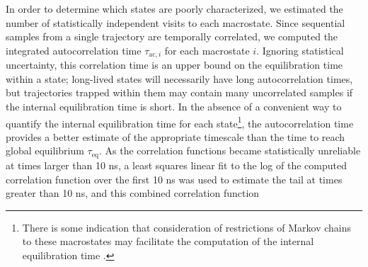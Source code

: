 In order to determine which states are poorly characterized, we estimated the number of statistically independent visits to each macrostate.
Since sequential samples from a single trajectory are temporally correlated, we computed the integrated autocorrelation time \cite{swope:1982a,janke:2002a} $\tau_{\mathrm{ac},i}$ for each macrostate $i$.
Ignoring statistical uncertainty, this correlation time is an upper bound on the equilibration time within a state; long-lived states will necessarily have long autocorrelation times, but trajectories trapped within them may contain many uncorrelated samples if the internal equilibration time is short.
In the absence of a convenient way to quantify the internal equilibration time for each state\footnote{There is some indication that consideration of restrictions of Markov chains to these macrostates may facilitate the computation of the internal equilibration time \cite{meerbach:2004a}.}, the autocorrelation time provides a better estimate of the appropriate timescale than the time to reach global equilibrium $\tau_{\mathrm{eq}}$.
As the correlation functions became statistically unreliable at times larger than 10 ns, a least squares linear fit to the log of the computed correlation function over the first 10 ns was used to estimate the tail at times greater than 10 ns, and this combined correlation function 

